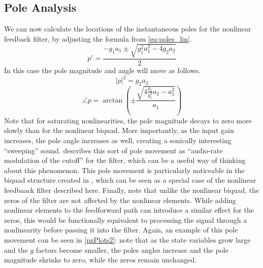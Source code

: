 \documentclass[twoside,a4paper]{article}
\begin{document}
\subsection{Pole Analysis}
%
We can now calculate the locations of the instantaneous poles for
the nonlinear feedback filter, by adjusting the formula from
\cref{eq:poles_lin}.
%
\begin{equation}
p' = \frac{-g_1 a_1 \pm \sqrt{g_1^2 a_1^2 - 4 g_2 a_2}}{2}
    \label{eq:poles_nl2}
\end{equation}
%
In this case the pole magnitude and angle will move as follows.
\begin{equation}
    |p|^2 = g_2a_2
    \label{eq:poles_nl2_mag}
\end{equation}
%
\begin{equation}
    \angle p = \arctan \left( \pm \frac{\sqrt{4\frac{g_2}{g_1^2}a_2 - a_1^2}}{a_1} \right)
    \label{eq:poles_nl2_angle}
\end{equation}
%
Note that for saturating nonlinearities, the pole magnitude decays to
zero more slowly than for the
nonlinear biquad. More importantly, as the input gain increases,
the pole angle increases as well, creating a sonically interesting
``sweeping'' sound. \cite{Vadim} describes this sort of
pole movement as ``audio-rate modulation of the cutoff'' for the
filter, which can be a useful way of thinking about this phenomenon.
This pole movement is particularly noticeable in the biquad structure
created in \cite{BiquadLimiter}, which can be seen as a special case
of the nonlinear feedbaack filter described here.
\newline\newline
Finally, note that unlike the nonlinear biquad, the zeros of the
filter are not affected by the nonlinear elements.
While adding nonlinear elements to the feedforward path can introduce 
a similar effect for the zeros, this would be
functionally equivalent to processing the signal through a nonlinearity
before passing it into the filter. Again, an example of this pole movement
can be seen in \cref{pzPlots2}: note that as the state variables grow
large and the $g$ factors become smaller, the poles angles increase and
the pole magnitude shrinks to zero, while the zeros remain unchanged.
%
\end{document}
